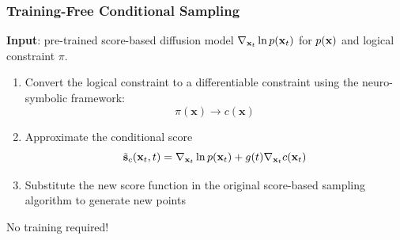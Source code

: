 \begin{frame}

\frametitle{Training-Free Conditional Sampling}

\textbf{Input}: pre-trained score-based diffusion model $\nabla_{\mathbf{x}_t} \ln p(\mathbf{x}_t)$ for $p(\mathbf{x})$ and logical constraint $\pi$.
\begin{enumerate}

    \item Convert the logical constraint to a differentiable constraint using the neuro-symbolic framework:
        \begin{equation}
            \pi(\mathbf{x}) \rightarrow c(\mathbf{x})
        \end{equation}
    
    \item Approximate the conditional score
        \begin{equation}
    \tilde{\mathbf{s}}_c(\mathbf{x}_t, t) = \nabla_{\mathbf{x}_t} \ln p(\mathbf{x}_t) + g(t) \nabla_{\mathbf{x}_t} c(\mathbf{x}_t)
        \end{equation}
    
    \item Substitute the new score function in the original score-based sampling algorithm to generate new points

\end{enumerate}

No training required!

\end{frame}

